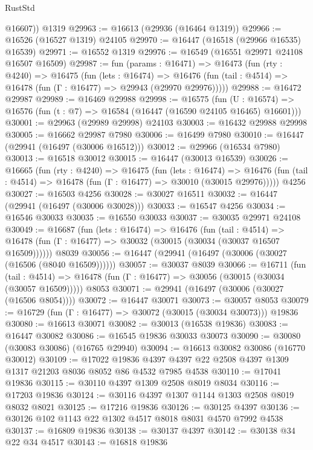 \begin{lexlean}{RustStd}
\begin{coremodule}
        @16607))
    @1319
@29963 := @16613 (@29936 (@16464 @1319))
@29966 := @16526 (@16527 @1319) @24105
@29970 := @16447 (@16518 (@29966 @16535) @16539)
@29971 := @16552 @1319
@29976 := @16549 (@16551 @29971 @24108 @16507 @16509)
@29987 := fun (params : @16471) =>
  @16473
    (fun (rty : @4240) =>
    @16475
      (fun (lets : @16474) =>
      @16476 (fun (tail : @4514) => @16478 (fun (Γ : @16477) => @29943 (@29970 @29976)))))
@29988 := @16472 @29987
@29989 := @16469 @29988
@29998 := @16575
    (fun (U : @16574) => @16576 (fun (t : @7) => @16584 (@16447 (@16590 @24105 @16465) @16601)))
@30001 := @29963 (@29989 @29998) @24103
@30003 := @16432 @29988 @29998
@30005 := @16662 @29987 @7980
@30006 := @16499 @7980
@30010 := @16447 (@29941 (@16497 (@30006 @16512)))
@30012 := @29966 (@16534 @7980)
@30013 := @16518 @30012
@30015 := @16447 (@30013 @16539)
@30026 := @16665
    (fun (rty : @4240) =>
    @16475
      (fun (lets : @16474) =>
      @16476 (fun (tail : @4514) => @16478 (fun (Γ : @16477) => @30010 (@30015 @29976)))))
    @4256
@30027 := @16503 @4256
@30028 := @30027 @16511
@30032 := @16447 (@29941 (@16497 (@30006 @30028)))
@30033 := @16547 @4256
@30034 := @16546 @30033
@30035 := @16550 @30033
@30037 := @30035 @29971 @24108
@30049 := @16687
    (fun (lets : @16474) =>
    @16476
      (fun (tail : @4514) =>
      @16478 (fun (Γ : @16477) => @30032 (@30015 (@30034 (@30037 @16507 @16509))))))
    @8039
@30056 := @16447 (@29941 (@16497 (@30006 (@30027 (@16506 (@8040 @16509))))))
@30057 := @30037 @8039
@30066 := @16711
    (fun (tail : @4514) => @16478 (fun (Γ : @16477) => @30056 (@30015 (@30034 (@30057 @16509)))))
    @8053
@30071 := @29941 (@16497 (@30006 (@30027 (@16506 @8054))))
@30072 := @16447 @30071
@30073 := @30057 @8053
@30079 := @16729 (fun (Γ : @16477) => @30072 (@30015 (@30034 @30073))) @19836
@30080 := @16613 @30071
@30082 := @30013 (@16538 @19836)
@30083 := @16447 @30082
@30086 := @16545 @19836 @30033 @30073
@30090 := @30080 (@30083 @30086) (@16765 @29940)
@30094 := @16613 @30082 @30086 (@16770 @30012)
@30109 := @17022
    @19836
    @4397
    @4397
    @22
    @2508
    @4397
    @1309
    @1317
    @21203
    @8036
    @8052
    @86
    @4532
    @7985
    @4538
@30110 := @17041 @19836
@30115 := @30110 @4397 @1309 @2508 @8019 @8034
@30116 := @17203 @19836
@30124 := @30116 @4397 @1307 @1144 @1303 @2508 @8019 @8032 @8021
@30125 := @17216 @19836
@30126 := @30125 @4397
@30136 := @30126 @102 @1143 @22 @1302 @4517 @8018 @8031 @4570 @7992 @4538
@30137 := @16809 @19836
@30138 := @30137 @4397
@30142 := @30138 @34 @22 @34 @4517
@30143 := @16818 @19836

\end{coremodule}
\end{lexlean}
